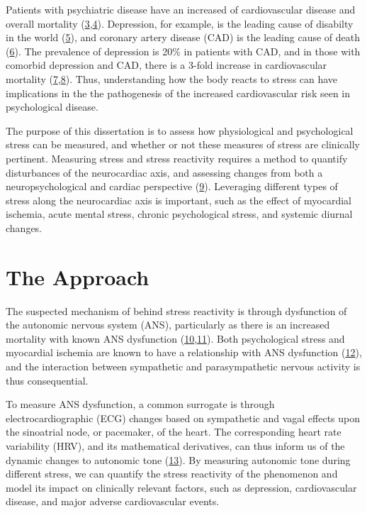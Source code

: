 \documentclass[
  11pt,
  openany]{book}
\begin{document}
Patients with psychiatric disease have an increased of cardiovascular disease and overall mortality (\protect\hyperlink{ref-Carney2002}{3},\protect\hyperlink{ref-Boscarino2008}{4}).
Depression, for example, is the leading cause of disabilty in the world (\protect\hyperlink{ref-Friedrich2017b}{5}), and coronary artery disease (CAD) is the leading cause of death (\protect\hyperlink{ref-McAloon2016b}{6}).
The prevalence of depression is 20\% in patients with CAD, and in those with comorbid depression and CAD, there is a 3-fold increase in cardiovascular mortality (\protect\hyperlink{ref-Jha2019}{7},\protect\hyperlink{ref-Meijer2011}{8}).
Thus, understanding how the body reacts to stress can have implications in the the pathogenesis of the increased cardiovascular risk seen in psychological disease.

The purpose of this dissertation is to assess how physiological and psychological stress can be measured, and whether or not these measures of stress are clinically pertinent.
Measuring stress and stress reactivity requires a method to quantify disturbances of the neurocardiac axis, and assessing changes from both a neuropsychological and cardiac perspective (\protect\hyperlink{ref-Davis1993}{9}).
Leveraging different types of stress along the neurocardiac axis is important, such as the effect of myocardial ischemia, acute mental stress, chronic psychological stress, and systemic diurnal changes.

\hypertarget{the-approach}{%
\chapter{The Approach}\label{the-approach}}

The suspected mechanism of behind stress reactivity is through dysfunction of the autonomic nervous system (ANS), particularly as there is an increased mortality with known ANS dysfunction (\protect\hyperlink{ref-LaRovere1998}{10},\protect\hyperlink{ref-Stein2000}{11}).
Both psychological stress and myocardial ischemia are known to have a relationship with ANS dysfunction (\protect\hyperlink{ref-Carney2005}{12}), and the interaction between sympathetic and parasympathetic nervous activity is thus consequential.

To measure ANS dysfunction, a common surrogate is through electrocardiographic (ECG) changes based on sympathetic and vagal effects upon the sinoatrial node, or pacemaker, of the heart.
The corresponding heart rate variability (HRV), and its mathematical derivatives, can thus inform us of the dynamic changes to autonomic tone (\protect\hyperlink{ref-Sassi2015}{13}).
By measuring autonomic tone during different stress, we can quantify the stress reactivity of the phenomenon and model its impact on clinically relevant factors, such as depression, cardiovascular disease, and major adverse cardiovascular events.
\end{document}
